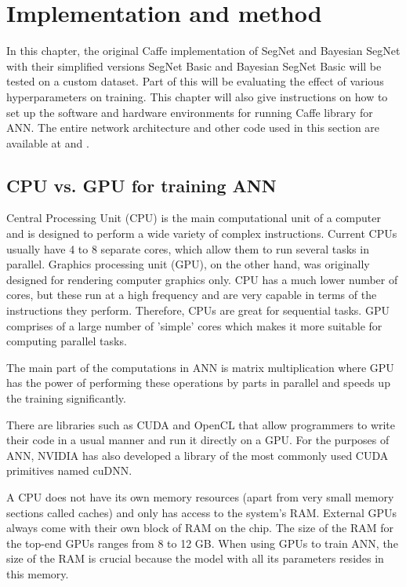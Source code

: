 \chapter{Implementation and method}

In this chapter, the original Caffe implementation of SegNet and Bayesian SegNet with their simplified versions SegNet Basic and Bayesian SegNet Basic will be tested on a custom dataset. Part of this will be evaluating the effect of various hyperparameters on training. This chapter will also give instructions on how to set up the software and hardware environments for running Caffe library for ANN. The entire network architecture and other code used in this section are available at \cite{filip_github} and \cite{filip_github_caffe}.

\section{CPU vs. GPU for training ANN}

Central Processing Unit (CPU) is the main computational unit of a computer and is designed to perform a wide variety of complex instructions. Current CPUs usually have 4 to 8 separate cores, which allow them to run several tasks in parallel. Graphics processing unit (GPU), on the other hand, was originally designed for rendering computer graphics only. CPU has a much lower number of cores, but these run at a high frequency and are very capable in terms of the instructions they perform. Therefore, CPUs are great for sequential tasks. GPU comprises of a large number of 'simple' cores which makes it more suitable for computing parallel tasks. \cite{stanford-L8}

The main part of the computations in ANN is matrix multiplication where GPU has the power of performing these operations by parts in parallel and speeds up the training significantly. \cite{stanford-L8}

There are libraries such as CUDA and OpenCL that allow programmers to write their code in a usual manner and run it directly on a GPU. For the purposes of ANN, NVIDIA has also developed a library of the most commonly used CUDA primitives named cuDNN. \cite{stanford-L8}
 
A CPU does not have its own memory resources (apart from very small memory sections called caches) and only has access to the system's RAM. External GPUs always come with their own block of RAM on the chip. The size of the RAM for the top-end GPUs ranges from 8 to 12 GB. When using GPUs to train ANN, the size of the RAM is crucial because the model with all its parameters resides in this memory. 


